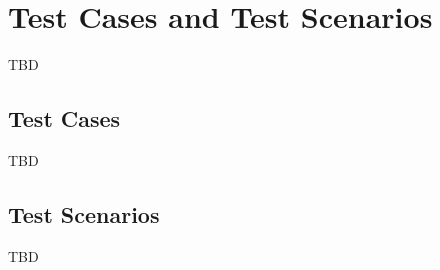 \section{Test Cases and Test Scenarios}
TBD
\subsection{Test Cases}
TBD
\subsection{Test Scenarios}
TBD